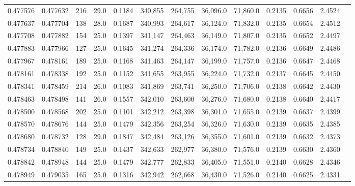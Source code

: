 \begin{tabular}{rrrrrrrrrrrrr}
0.477576 & 0.477632 &   216 & 29.0 &                                     0.1184 & 340,855 & 264,755 &  36,096.0 &  71,860.0 & 0.2135 & 0.6656 & 2.4524 \\
0.477637 & 0.477704 &   138 & 28.0 &                                     0.1687 & 340,993 & 264,617 &  36,124.0 &  71,832.0 & 0.2135 & 0.6654 & 2.4512 \\
0.477708 & 0.477882 &   154 & 25.0 &                                     0.1397 & 341,147 & 264,463 &  36,149.0 &  71,807.0 & 0.2135 & 0.6652 & 2.4497 \\
0.477883 & 0.477966 &   127 & 25.0 &                                     0.1645 & 341,274 & 264,336 &  36,174.0 &  71,782.0 & 0.2136 & 0.6649 & 2.4486 \\
0.477967 & 0.478161 &   189 & 25.0 &                                     0.1168 & 341,463 & 264,147 &  36,199.0 &  71,757.0 & 0.2136 & 0.6647 & 2.4468 \\
0.478161 & 0.478338 &   192 & 25.0 &                                     0.1152 & 341,655 & 263,955 &  36,224.0 &  71,732.0 & 0.2137 & 0.6645 & 2.4450 \\
0.478341 & 0.478459 &   214 & 26.0 &                                     0.1083 & 341,869 & 263,741 &  36,250.0 &  71,706.0 & 0.2138 & 0.6642 & 2.4430 \\
0.478463 & 0.478498 &   141 & 26.0 &                                     0.1557 & 342,010 & 263,600 &  36,276.0 &  71,680.0 & 0.2138 & 0.6640 & 2.4417 \\
0.478500 & 0.478568 &   202 & 25.0 &                                     0.1101 & 342,212 & 263,398 &  36,301.0 &  71,655.0 & 0.2139 & 0.6637 & 2.4399 \\
0.478570 & 0.478676 &   144 & 25.0 &                                     0.1479 & 342,356 & 263,254 &  36,326.0 &  71,630.0 & 0.2139 & 0.6635 & 2.4385 \\
0.478680 & 0.478732 &   128 & 29.0 &                                     0.1847 & 342,484 & 263,126 &  36,355.0 &  71,601.0 & 0.2139 & 0.6632 & 2.4373 \\
0.478734 & 0.478840 &   149 & 25.0 &                                     0.1437 & 342,633 & 262,977 &  36,380.0 &  71,576.0 & 0.2139 & 0.6630 & 2.4360 \\
0.478842 & 0.478948 &   144 & 25.0 &                                     0.1479 & 342,777 & 262,833 &  36,405.0 &  71,551.0 & 0.2140 & 0.6628 & 2.4346 \\
0.478949 & 0.479035 &   165 & 25.0 &                                     0.1316 & 342,942 & 262,668 &  36,430.0 &  71,526.0 & 0.2140 & 0.6625 & 2.4331 \\

\end{tabular}
